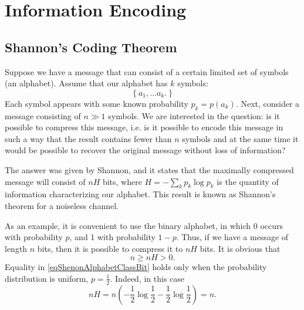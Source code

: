 \section{Information Encoding}

\subsection{Shannon's Coding Theorem}
Suppose we have a message that can consist of
a certain limited set of symbols (an alphabet). Assume that
our alphabet has $k$ symbols:
\begin{equation}
\left\{
a_1, \dots a_k.
\right\}
\label{eqShenonAlphabetClass}
\end{equation}
Each symbol appears with some known probability
$p_k = p\left(a_k\right)$. Next, consider a message consisting of $n
\gg 1$ symbols. We are interested in the question: is it possible to compress this message,
i.e. is it possible to encode this message in such a way that the
result contains fewer than $n$ symbols and at the same time it would be
possible to recover the original message without loss of information?

The answer was given by Shannon, and it states that the maximally compressed message
will consist of $n H$ bits, where $H = - \sum_k p_k \log p_k$ is
the quantity of information characterizing our alphabet. This
result is known as Shannon's theorem for a noiseless channel.

As an example, it is convenient to use the binary alphabet, in which 0
occurs with probability $p$, and 1 with probability $1 -
p$. Thus, if we have a message of length $n$ bits, then it is
possible to compress it to $n H$ bits. It is obvious that 
\begin{equation}
n \ge n H > 0.
\label{eqShenonAlphabetClassBit}
\end{equation}
Equality in \eqref{eqShenonAlphabetClassBit} holds only when the probability distribution is uniform, $p =
\frac{1}{2}$. Indeed, in this case 
\[
n H = n \left(- \frac{1}{2} \log \frac{1}{2} - \frac{1}{2} \log
  \frac{1}{2}\right) = n.
\]

